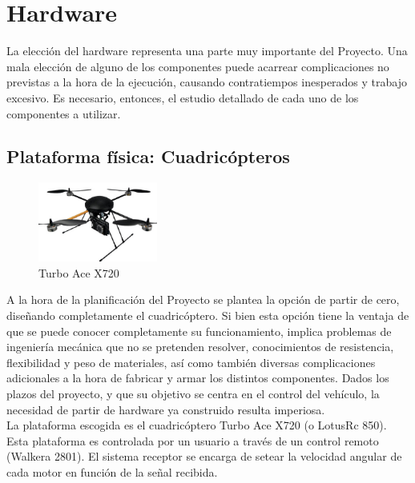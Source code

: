 \documentclass[main]{subfiles}
\begin{document}
\chapter{Hardware}
La elecci\'on del hardware representa una parte muy importante del Proyecto. Una mala elecci\'on de alguno de los componentes puede acarrear complicaciones no previstas a la hora de la ejecuci\'on, causando contratiempos inesperados y trabajo excesivo. Es necesario, entonces, el estudio detallado de cada uno de los componentes a utilizar.

\section{Plataforma f\'isica: Cuadric\'opteros}

\begin{figure}
\vspace{20pt}
	\centering
	\includegraphics[width=0.35\textwidth]{./pics_eleccion_hardware/turboace.png}
	\caption{Turbo Ace X720}
	\label{fig:cuadricoptero}
\vspace{20pt}
\end{figure}

A la hora de la planificaci\'on del Proyecto se plantea la opci\'on de partir de cero, dise\~nando completamente el cuadric\'optero. Si bien esta opci\'on tiene la ventaja de que se puede conocer completamente su funcionamiento, implica problemas de ingenier\'ia mec\'anica que no se pretenden resolver, conocimientos de resistencia, flexibilidad y peso de materiales, as\'i como tambi\'en diversas complicaciones adicionales a la hora de fabricar y armar los distintos componentes. Dados los plazos del proyecto, y que su objetivo se centra en el control del veh\'iculo, la necesidad de partir de hardware ya construido resulta imperiosa.\\

La plataforma escogida es el cuadric\'optero Turbo Ace X720 (o LotusRc 850). Esta plataforma es controlada por un usuario a trav\'es de un control remoto (Walkera 2801). El sistema receptor se encarga de setear la velocidad angular de cada motor en funci\'on de la se\~nal recibida.
\end{document}
